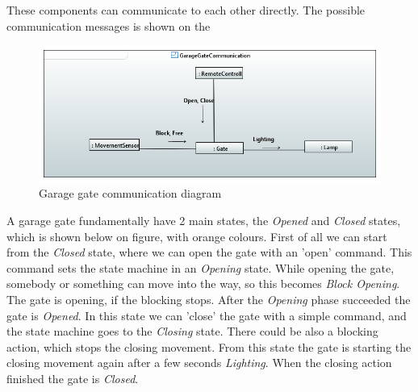 These components can communicate to each other directly. The possible communication messages is shown on the 

\begin{figure}[!ht]
	\centering
	\includegraphics[width=150mm, keepaspectratio]{figures/communication.png}
	\caption{Garage gate communication diagram}
	\label{fig:Garage communication}
\end{figure}

A garage gate fundamentally have 2 main states, the \textit{Opened} and \textit{Closed} states, which is shown below on  figure, with orange colours.  First of all we can start from the \textit{Closed} state, where we can open the gate with an 'open' command. This command sets the state machine in an \textit{Opening} state. While opening the gate, somebody or something can move into the way, so this becomes \textit{Block Opening}. The gate is opening, if the blocking stops. After the \textit{Opening} phase succeeded the gate is \textit{Opened}. In this state we can 'close' the gate with a simple command, and the state machine goes to the \textit{Closing} state. There could be also a blocking action, which stops the closing movement. From this state the gate is starting the closing movement again after a few seconds \textit{Lighting}. When the closing action finished the gate is \textit{Closed}.




